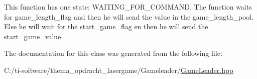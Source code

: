 This function has one state\+: W\+A\+I\+T\+I\+N\+G\+\_\+\+F\+O\+R\+\_\+\+C\+O\+M\+M\+A\+ND. The function waits for game\+\_\+length\+\_\+flag and then he will send the value in the game\+\_\+length\+\_\+pool. Else he will wait for the start\+\_\+game\+\_\+flag en then he will send the start\+\_\+game\+\_\+value. 

The documentation for this class was generated from the following file\+:\begin{DoxyCompactItemize}
\item 
C\+:/ti-\/software/thema\+\_\+opdracht\+\_\+lasergame/\+Gameleader/\mbox{\hyperlink{_game_leader_8hpp}{Game\+Leader.\+hpp}}\end{DoxyCompactItemize}

